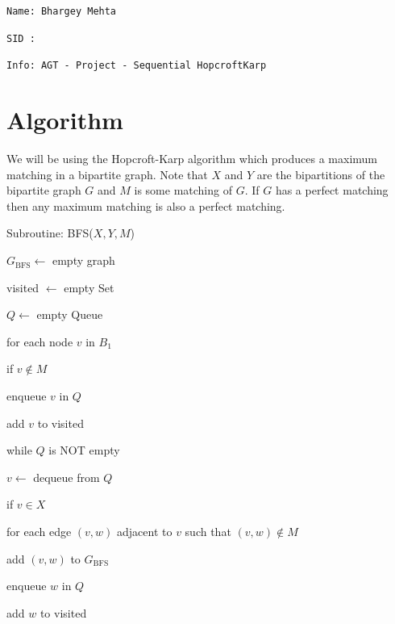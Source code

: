 \documentclass{article}
\begin{document}
\Large{\texttt{Name: Bhargey Mehta}}

\Large{\texttt{SID : }}

\Large{\texttt{Info: AGT - Project - Sequential HopcroftKarp}}

\section{Algorithm}
We will be using the Hopcroft-Karp algorithm which produces a maximum matching in a bipartite graph. Note that $X$ and $Y$ are the bipartitions of the bipartite graph $G$ and $M$ is some matching of $G$. If $G$ has a perfect matching then any maximum matching is also a perfect matching.

\vspace{0.5cm}

Subroutine: BFS($X, Y, M$) \dotfill

\hspace{1cm} $G_{\mathrm{BFS}} \leftarrow$ empty graph

\hspace{1cm} visited $\leftarrow$ empty Set

\hspace{1cm} $Q \leftarrow$ empty Queue

\hspace{1cm} for each node $v$ in $B_1$

\hspace{2cm} if $v \notin M$

\hspace{3cm} enqueue $v$ in $Q$

\hspace{3cm} add $v$ to visited

\hspace{1cm} while $Q$ is NOT empty

\hspace{2cm} $v \leftarrow$ dequeue from $Q$

\hspace{2cm} if $v \in X$

\hspace{3cm} for each edge $(v, w)$ adjacent to $v$ such that $(v, w) \notin M$

\hspace{4cm} add $(v, w)$ to $G_{\mathrm{BFS}}$

\hspace{4cm} enqueue $w$ in $Q$

\hspace{4cm} add $w$ to visited
\end{document}
